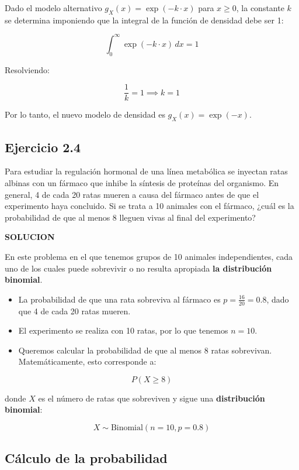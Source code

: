 \documentclass[
]{article}
\begin{document}
Dado el modelo alternativo \(g_X(x) = \exp(-k \cdot x)\) para \(x \geq 0\), la constante \(k\) se determina imponiendo que la integral de la función de densidad debe ser 1:

\[
\int_0^\infty \exp(-k \cdot x) \, dx = 1
\]

Resolviendo:

\[
\frac{1}{k} = 1 \implies k = 1
\]

Por lo tanto, el nuevo modelo de densidad es \(g_X(x) = \exp(-x)\).

\subsection{Ejercicio 2.4}\label{ejercicio-2.4}

Para estudiar la regulación hormonal de una línea metabólica se inyectan ratas albinas con un fármaco que inhibe la síntesis de proteínas del organismo. En general, 4 de cada 20 ratas mueren a causa del fármaco antes de que el experimento haya concluido. Si se trata a 10 animales con el fármaco, ¿cuál es la probabilidad de que al menos 8 lleguen vivas al final del experimento?

\textbf{SOLUCION}

En este problema en el que tenemos grupos de 10 animales independientes, cada uno de los cuales puede sobrevivir o no resulta apropiada \textbf{la distribución binomial}.

\begin{itemize}
\item
  La probabilidad de que una rata sobreviva al fármaco es \(p = \frac{16}{20} = 0.8\), dado que 4 de cada 20 ratas mueren.
\item
  El experimento se realiza con 10 ratas, por lo que tenemos \(n = 10\).
\item
  Queremos calcular la probabilidad de que al menos 8 ratas sobrevivan. Matemáticamente, esto corresponde a:
\end{itemize}

\[
P(X \geq 8)
\]

donde \(X\) es el número de ratas que sobreviven y sigue una \textbf{distribución binomial}:

\[
X \sim \text{Binomial}(n=10, p=0.8)
\]

\subsection{Cálculo de la probabilidad}\label{cuxe1lculo-de-la-probabilidad}
\end{document}
